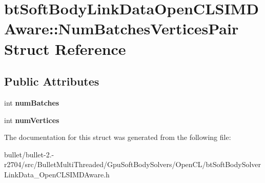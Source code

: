 \hypertarget{structbt_soft_body_link_data_open_c_l_s_i_m_d_aware_1_1_num_batches_vertices_pair}{\section{bt\+Soft\+Body\+Link\+Data\+Open\+C\+L\+S\+I\+M\+D\+Aware\+:\+:Num\+Batches\+Vertices\+Pair Struct Reference}
\label{structbt_soft_body_link_data_open_c_l_s_i_m_d_aware_1_1_num_batches_vertices_pair}
}
\subsection*{Public Attributes}
\begin{DoxyCompactItemize}
\item 
\hypertarget{structbt_soft_body_link_data_open_c_l_s_i_m_d_aware_1_1_num_batches_vertices_pair_ad1b1253804abc5baecdecaf7f2e1d0d5}{int {\bfseries num\+Batches}}\label{structbt_soft_body_link_data_open_c_l_s_i_m_d_aware_1_1_num_batches_vertices_pair_ad1b1253804abc5baecdecaf7f2e1d0d5}

\item 
\hypertarget{structbt_soft_body_link_data_open_c_l_s_i_m_d_aware_1_1_num_batches_vertices_pair_a3680f04e7446e75270e264172faec5fa}{int {\bfseries num\+Vertices}}\label{structbt_soft_body_link_data_open_c_l_s_i_m_d_aware_1_1_num_batches_vertices_pair_a3680f04e7446e75270e264172faec5fa}

\end{DoxyCompactItemize}


The documentation for this struct was generated from the following file\+:\begin{DoxyCompactItemize}
\item 
bullet/bullet-\/2.-\/r2704/src/\+Bullet\+Multi\+Threaded/\+Gpu\+Soft\+Body\+Solvers/\+Open\+C\+L/bt\+Soft\+Body\+Solver\+Link\+Data\+\_\+\+Open\+C\+L\+S\+I\+M\+D\+Aware.\+h\end{DoxyCompactItemize}

